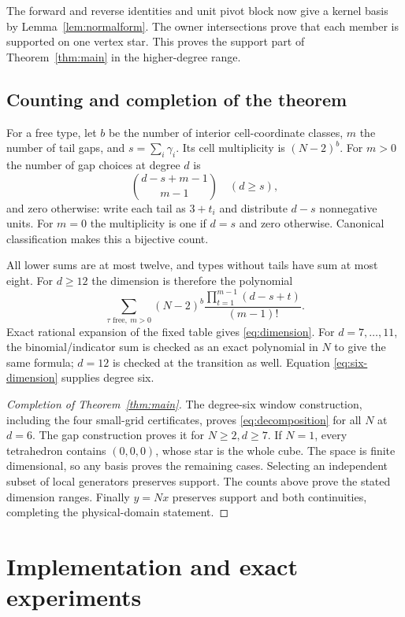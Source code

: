 \documentclass[11pt]{article}
\theoremstyle{remark}
\begin{document}
The forward and reverse identities and unit pivot block now give a kernel
basis by Lemma~\ref{lem:normalform}. The owner intersections prove that
each member is supported on one vertex star. This proves the support
part of Theorem~\ref{thm:main} in the higher-degree range.

\subsection{Counting and completion of the theorem}

For a free type, let $b$ be the number of interior cell-coordinate classes,
$m$ the number of tail gaps, and $s=\sum_i\gamma_i$. Its cell multiplicity
is $(N-2)^b$. For $m>0$ the number of gap choices at degree $d$ is
\[
 \binom{d-s+m-1}{m-1}\quad(d\ge s),
\]
and zero otherwise: write each tail as $3+t_i$ and distribute $d-s$
nonnegative units. For $m=0$ the multiplicity is one if $d=s$ and zero
otherwise. Canonical classification makes this a bijective count.

All lower sums are at most twelve, and types without tails have sum at
most eight. For $d\ge12$ the dimension is therefore the polynomial
\begin{equation}\label{eq:count}
 \sum_{\tau\text{ free},\ m>0}
 (N-2)^b\frac{\prod_{t=1}^{m-1}(d-s+t)}{(m-1)!}.
\end{equation}
Exact rational expansion of the fixed table gives
\eqref{eq:dimension}. For $d=7,\ldots,11$, the binomial/indicator
sum is checked as an exact polynomial in $N$ to give the same formula;
$d=12$ is checked at the transition as well. Equation
\eqref{eq:six-dimension} supplies degree six.

\begin{proof}[Completion of Theorem~\ref{thm:main}]
The degree-six window construction, including the four small-grid
certificates, proves \eqref{eq:decomposition} for all $N$ at $d=6$.
The gap construction proves it for $N\ge2,d\ge7$. If $N=1$, every
tetrahedron contains $(0,0,0)$, whose star is the whole cube. The space
is finite dimensional, so any basis proves the remaining cases. Selecting
an independent subset of local generators preserves support. The counts
above prove the stated dimension ranges. Finally $y=Nx$ preserves support
and both continuities, completing the physical-domain statement.
\end{proof}

\section{Implementation and exact experiments}\label{sec:implementation}
\end{document}
